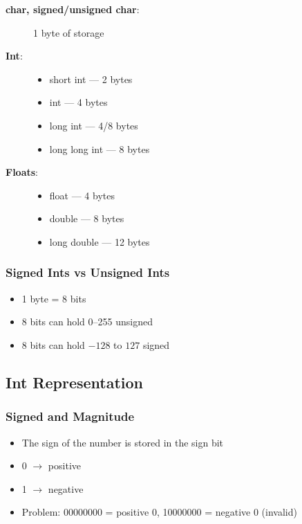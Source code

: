 \documentclass[11pt,a4paper]{article}
\begin{document}
\begin{description}
    \item[\textbf{char, signed/unsigned char}:] 1 byte of storage
    
    \item[\textbf{Int}:]
    \begin{itemize}
        \item short int --- 2 bytes
        \item int --- 4 bytes
        \item long int --- 4/8 bytes
        \item long long int --- 8 bytes
    \end{itemize}
    
    \item[\textbf{Floats}:]
    \begin{itemize}
        \item float --- 4 bytes
        \item double --- 8 bytes
        \item long double --- 12 bytes
    \end{itemize}
\end{description}

\subsubsection{Signed Ints vs Unsigned Ints}

\begin{itemize}
    \item 1 byte = 8 bits
    \item 8 bits can hold 0--255 unsigned
    \item 8 bits can hold $-128$ to $127$ signed
\end{itemize}

\subsection{Int Representation}

\subsubsection{Signed and Magnitude}
\begin{itemize}
    \item The sign of the number is stored in the sign bit
    \item 0 $\rightarrow$ positive
    \item 1 $\rightarrow$ negative
    \item Problem: 00000000 = positive 0, 10000000 = negative 0 (invalid)
\end{itemize}
\end{document}
